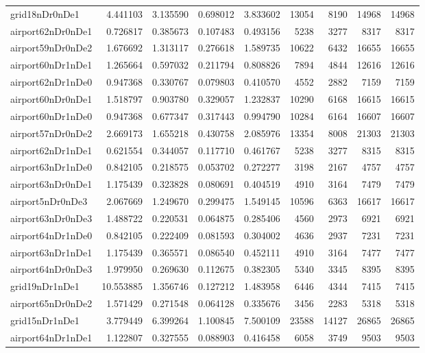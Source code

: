 \begin{longtable}{|l|r|r|r|r|r|r|r|r|}
grid18nDr0nDe1 & 4.441103 & 3.135590 & 0.698012 & 3.833602 & 13054 & 8190 & 14968 & 14968 \\
airport62nDr0nDe1 & 0.726817 & 0.385673 & 0.107483 & 0.493156 & 5238 & 3277 & 8317 & 8317 \\
airport59nDr0nDe2 & 1.676692 & 1.313117 & 0.276618 & 1.589735 & 10622 & 6432 & 16655 & 16655 \\
airport60nDr1nDe1 & 1.265664 & 0.597032 & 0.211794 & 0.808826 & 7894 & 4844 & 12616 & 12616 \\
airport62nDr1nDe0 & 0.947368 & 0.330767 & 0.079803 & 0.410570 & 4552 & 2882 & 7159 & 7159 \\
airport60nDr0nDe1 & 1.518797 & 0.903780 & 0.329057 & 1.232837 & 10290 & 6168 & 16615 & 16615 \\
airport60nDr1nDe0 & 0.947368 & 0.677347 & 0.317443 & 0.994790 & 10284 & 6164 & 16607 & 16607 \\
airport57nDr0nDe2 & 2.669173 & 1.655218 & 0.430758 & 2.085976 & 13354 & 8008 & 21303 & 21303 \\
airport62nDr1nDe1 & 0.621554 & 0.344057 & 0.117710 & 0.461767 & 5238 & 3277 & 8315 & 8315 \\
airport63nDr1nDe0 & 0.842105 & 0.218575 & 0.053702 & 0.272277 & 3198 & 2167 & 4757 & 4757 \\
airport63nDr0nDe1 & 1.175439 & 0.323828 & 0.080691 & 0.404519 & 4910 & 3164 & 7479 & 7479 \\
airport5nDr0nDe3 & 2.067669 & 1.249670 & 0.299475 & 1.549145 & 10596 & 6363 & 16617 & 16617 \\
airport63nDr0nDe3 & 1.488722 & 0.220531 & 0.064875 & 0.285406 & 4560 & 2973 & 6921 & 6921 \\
airport64nDr1nDe0 & 0.842105 & 0.222409 & 0.081593 & 0.304002 & 4636 & 2937 & 7231 & 7231 \\
airport63nDr1nDe1 & 1.175439 & 0.365571 & 0.086540 & 0.452111 & 4910 & 3164 & 7477 & 7477 \\
airport64nDr0nDe3 & 1.979950 & 0.269630 & 0.112675 & 0.382305 & 5340 & 3345 & 8395 & 8395 \\
grid19nDr1nDe1 & 10.553885 & 1.356746 & 0.127212 & 1.483958 & 6446 & 4344 & 7415 & 7415 \\
airport65nDr0nDe2 & 1.571429 & 0.271548 & 0.064128 & 0.335676 & 3456 & 2283 & 5318 & 5318 \\
grid15nDr1nDe1 & 3.779449 & 6.399264 & 1.100845 & 7.500109 & 23588 & 14127 & 26865 & 26865 \\
airport64nDr1nDe1 & 1.122807 & 0.327555 & 0.088903 & 0.416458 & 6058 & 3749 & 9503 & 9503 \\

\end{longtable}
